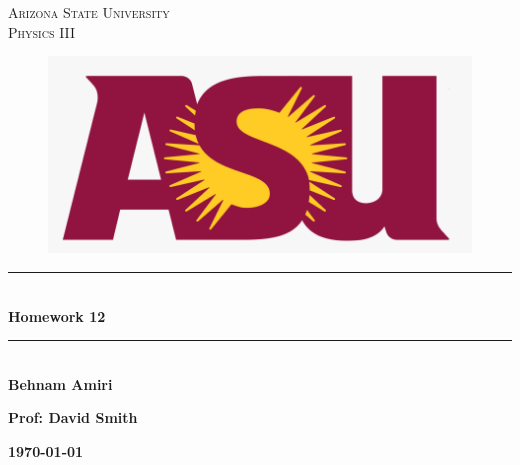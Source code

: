 \documentclass[fleqn]{article}
\begin{document}
  \begin{titlepage}

    \newcommand{\HRule}{\rule{\linewidth}{0.5mm}} %

    \center %



    \textsc{\LARGE Arizona State University}\\[1.5cm] %

    \textsc{\LARGE Physics III }\\[1.5cm] %


    \begin{figure}
      \includegraphics[width=\linewidth]{asu.png}
    \end{figure}


    \HRule \\[0.4cm]
    { \huge \bfseries Homework 12}\\[0.4cm] 
    \HRule \\[1.5cm]

    \textbf{Behnam Amiri}

    \bigbreak

    \textbf{Prof: David Smith}

    \bigbreak


    \textbf{{\large \today}\\[2cm]}

    \vfill %

  \end{titlepage}
\end{document}

